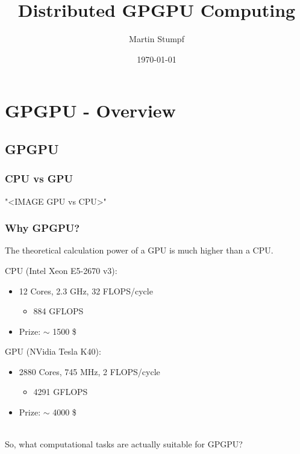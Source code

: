 \documentclass{beamer}
\title{Distributed GPGPU Computing}
\author{Martin Stumpf}
\institute{Ste||ar Group, Louisiana State University}
\date{\today}
\begin{document}
\frame{\titlepage}

\section{GPGPU - Overview}


\subsection{GPGPU}

\begin{frame}
    \frametitle{CPU vs GPU}
    "<IMAGE GPU vs CPU>"
\end{frame}

\begin{frame}
    \frametitle{Why GPGPU?}

    The \alert{theoretical} calculation power of a GPU is much higher
    than a CPU.

    \begin{example}
        CPU (Intel Xeon E5-2670 v3):
        \begin{itemize}
            \item 12 Cores, 2.3 GHz, 32 FLOPS/cycle
            \begin{itemize}
                \item \alert{884 GFLOPS}
            \end{itemize}
            \item Prize: $\sim$ \alert{1500} \$
        \end{itemize}
        GPU (NVidia Tesla K40):
        \begin{itemize}
            \item 2880 Cores, 745 MHz, 2 FLOPS/cycle
            \begin{itemize}
                \item \alert{4291 GFLOPS}
            \end{itemize}
            \item Prize: $\sim$ \alert{4000} \$
        \end{itemize}
    \end{example}
    ~\\
    So, what computational tasks are actually suitable for GPGPU?
\end{frame}
\end{document}
